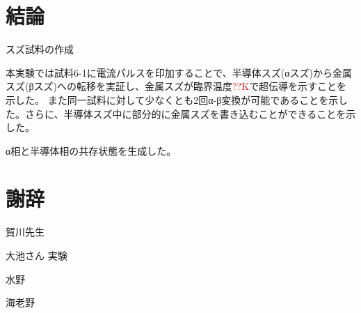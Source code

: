 \section{結論}
スズ試料の作成

本実験では試料6-1に電流パルスを印加することで、半導体スズ(αスズ)から金属スズ(βスズ)への転移を実証し、金属スズが臨界温度\textcolor{red}{??K}で超伝導を示すことを示した。
また同一試料に対して少なくとも2回α-β変換が可能であることを示した。さらに、半導体スズ中に部分的に金属スズを書き込むことができることを示した。

α相と半導体相の共存状態を生成した。

\section*{謝辞}
賀川先生

大池さん
実験

水野

海老野

\newpage